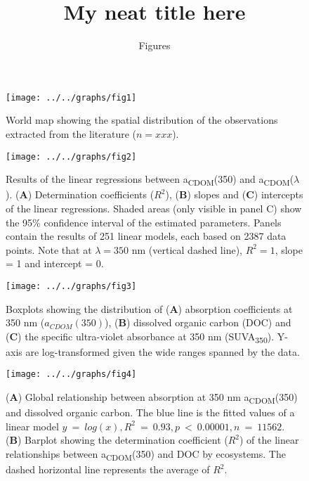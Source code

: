 \documentclass[10pt,a4paper]{scrartcl}
\title{My neat title here}
\subtitle{Figures}
\date{}
\begin{document}
\maketitle

\begin{figure}[h]
	\centering
	\texttt{[image: ../../graphs/fig1]}
	\caption{World map showing the spatial distribution of the observations extracted from the literature ($n = xxx$).}
\end{figure}

\clearpage
\newpage

\begin{figure}[h]
	\centering
	\texttt{[image: ../../graphs/fig2]}
	\caption{Results of the linear regressions between a\textsubscript{CDOM}(350) and a\textsubscript{CDOM}($\lambda$). (\textbf{A}) Determination coefficients ($R^2$), (\textbf{B}) slopes and (\textbf{C}) intercepts of the linear regressions. Shaded areas (only visible in panel C) show the 95\% confidence interval of the estimated parameters. Panels contain the results of 251 linear models, each based on 2387 data points. Note that at $\lambda = 350$ nm (vertical dashed line), $R^2 = 1$, slope = 1 and intercept = 0.}
\end{figure}

\clearpage
\newpage

\begin{figure}[h]
	\centering
	\texttt{[image: ../../graphs/fig3]}
	\caption{Boxplots showing the distribution of (\textbf{A}) absorption coefficients at 350 nm ($a_{CDOM}(350)$), (\textbf{B}) dissolved organic carbon (DOC) and (\textbf{C}) the specific ultra-violet absorbance at 350 nm (SUVA\textsubscript{350}). Y-axis are log-transformed given the wide ranges spanned by the data.}
\end{figure}

\clearpage
\newpage

\begin{figure}[h]
	\centering
	\texttt{[image: ../../graphs/fig4]}
	\caption{(\textbf{A}) Global relationship between absorption at 350 nm a\textsubscript{CDOM}(350) and dissolved organic carbon. The blue line is the fitted values of a linear model $y~=~log(x), R^2~=~0.93, p~<~0.00001, n~=~11562$. (\textbf{B}) Barplot showing the determination coefficient ($R^2$) of the linear relationships between a\textsubscript{CDOM}(350) and DOC by ecosystems. The dashed horizontal line represents the average of $R^2$.}
\end{figure}
\end{document}
